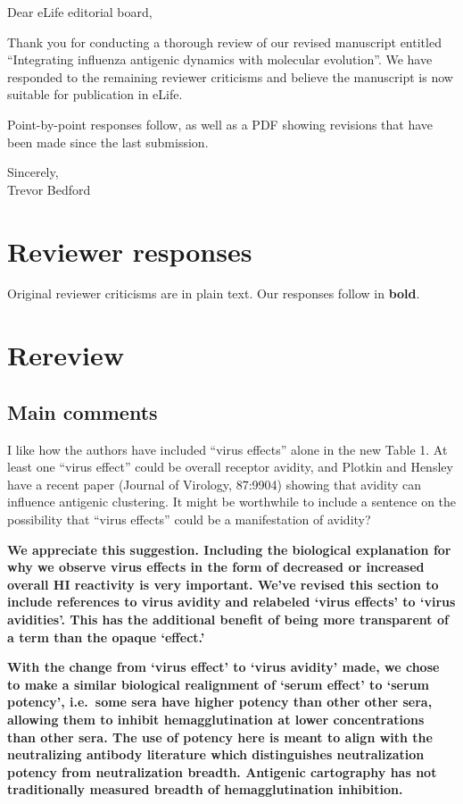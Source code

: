 \documentclass[11pt,oneside,letterpaper]{article}
\begin{document}

Dear eLife editorial board,

Thank you for conducting a thorough review of our revised manuscript entitled ``Integrating influenza antigenic dynamics with molecular evolution''.  We have responded to the remaining reviewer criticisms and believe the manuscript is now suitable for publication in eLife.

Point-by-point responses follow, as well as a PDF showing revisions that have been made since the last submission.

Sincerely,\\
Trevor Bedford

\restoregeometry

\newpage

\section*{Reviewer responses}

Original reviewer criticisms are in plain text.  Our responses follow in \textbf{bold}.  

\section*{Rereview}

\subsection*{Main comments}

I like how the authors have included ``virus effects'' alone in the new Table 1. At least one ``virus effect'' could be overall receptor avidity, and Plotkin and Hensley have a recent paper (Journal of Virology, 87:9904) showing that avidity can influence antigenic clustering. It might be worthwhile to include a sentence on the possibility that ``virus effects'' could be a manifestation of avidity? 

\textbf{We appreciate this suggestion.  Including the biological explanation for why we observe virus effects in the form of decreased or increased overall HI reactivity is very important.  We've revised this section to include references to virus avidity and relabeled `virus effects' to `virus avidities'.  This has the additional benefit of being more transparent of a term than the opaque `effect.'}

\textbf{With the change from `virus effect' to `virus avidity' made, we chose to make a similar biological realignment of `serum effect' to `serum potency', i.e.\ some sera have higher potency than other other sera, allowing them to inhibit hemagglutination at lower concentrations than other sera.  The use of potency here is meant to align with the neutralizing antibody literature which distinguishes neutralization potency from neutralization breadth.  Antigenic cartography has not traditionally measured breadth of hemagglutination inhibition.}
\end{document}
